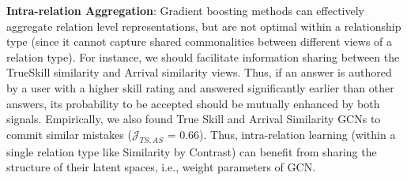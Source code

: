 \noindent
\textbf{Intra-relation Aggregation}: Gradient boosting methods can effectively aggregate relation level representations, but are not optimal within a relationship type (since it cannot capture shared commonalities between different views of a relation type). For instance, we should facilitate information sharing between the TrueSkill similarity and Arrival similarity views. Thus, if an answer is authored by a user with a higher skill rating and answered significantly earlier than other answers, its probability to be accepted should be mutually enhanced by both signals. Empirically, we also found True Skill and Arrival Similarity GCNs to commit similar mistakes ($\mathcal{J}_{TS,AS}$ = 0.66). Thus, intra-relation learning (within a single relation type like Similarity by Contrast) can benefit from sharing the structure of their latent spaces, i.e., weight parameters of GCN.







